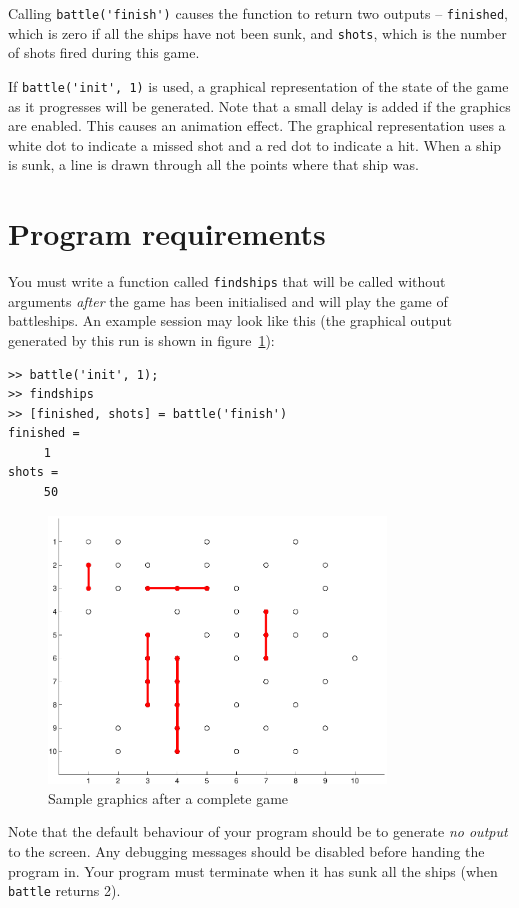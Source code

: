\documentclass[a4paper, 12pt]{article}
\begin{document}
Calling \verb|battle('finish')| causes the function to return two
outputs -- \verb|finished|, which is zero if all the ships have not
been sunk, and \verb|shots|, which is the number of shots fired during
this game.

If \verb|battle('init', 1)| is used, a graphical representation of the
state of the game as it progresses will be generated.  Note that a
small delay is added if the graphics are enabled.  This causes an
animation effect.  The graphical representation uses a white dot to
indicate a missed shot and a red dot to indicate a hit.  When a ship
is sunk, a line is drawn through all the points where that ship was.

\section{Program requirements}
You must write a function called \verb|findships| that will be called
without arguments \emph{after} the game has been initialised and will
play the game of battleships.  An example session may look like this
(the graphical output generated by this run is shown in
figure~\ref{fig:sampleoutput}):

\begin{verbatim}
>> battle('init', 1);
>> findships
>> [finished, shots] = battle('finish')
finished =
     1
shots =
     50
\end{verbatim}

\begin{figure}[htbp]
  \centering
  \includegraphics[width=0.8\textwidth]{sample}
  \caption{Sample graphics after a complete game}
  \label{fig:sampleoutput}
\end{figure}

Note that the default behaviour of your program should be to generate
\emph{no output} to the screen.  Any debugging messages should be
disabled before handing the program in.  Your program must terminate
when it has sunk all the ships (when \verb|battle| returns 2).
\end{document}

